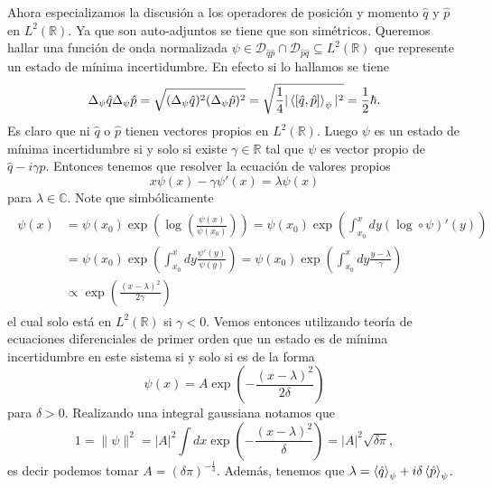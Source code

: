 \documentclass{article}
\begin{document}
\begin{enumerate}
Ahora especializamos la discusión a los operadores de posición y momento $\hat{q}$ y $\hat{p}$ en $L^2(\mathbb{R})$. Ya que son auto-adjuntos se tiene que son simétricos. Queremos hallar una función de onda normalizada $\psi\in\mathcal{D}_{\hat{q}\hat{p}}\cap\mathcal{D}_{\hat{p}\hat{q}}\subseteq L^2(\mathbb{R})$ que represente un estado de mínima incertidumbre. En efecto si lo hallamos se tiene
\begin{equation}
\Delta_\psi \hat{q}\Delta_\psi \hat{p}=\sqrt{(\Delta_\psi \hat{q})^2(\Delta_\psi \hat{p})^2}=\sqrt{\frac{1}{4}|\ev{[\hat{q},\hat{p}]}_\psi|^2}=\frac{1}{2}\hbar.
\end{equation}
Es claro que ni $\hat{q}$ o $\hat{p}$ tienen vectores propios en $L^2(\mathbb{R})$. Luego $\psi$ es un estado de mínima incertidumbre si y solo si existe $\gamma\in\mathbb{R}$ tal que $\psi$ es vector propio de $\hat{q}-i\gamma\hat{p}$. Entonces tenemos que resolver la ecuación de valores propios
\begin{equation}
x\psi(x)-\gamma\psi'(x)=\lambda\psi(x)
\end{equation}
para $\lambda\in\mathbb{C}$. Note que simbólicamente
\begin{align}
\begin{split}
\psi(x)&=\psi(x_0)\exp(\log(\frac{\psi(x)}{\psi(x_0)}))=\psi(x_0)\exp(\int_{x_0}^xdy(\log\circ\psi)'(y))\\
&=\psi(x_0)\exp(\int_{x_0}^xdy\frac{\psi'(y)}{\psi(y)})=\psi(x_0)\exp(\int_{x_0}^xdy\frac{y-\lambda}{\gamma})\\
&\propto\exp(\frac{(x-\lambda)^2}{2\gamma})
\end{split}
\end{align}
el cual solo está en $L^2(\mathbb{R})$ si $\gamma<0$. Vemos entonces utilizando teoría de ecuaciones diferenciales de primer orden que un estado es de mínima incertidumbre en este sistema si y solo si es de la forma
\begin{equation}
\psi(x)=A\exp(-\frac{(x-\lambda)^2}{2\delta})
\end{equation}
para $\delta>0$. Realizando una integral gaussiana notamos que 
\begin{equation}
1=\|\psi\|^2=|A|^2\int dx \exp(-\frac{(x-\lambda)^2}{\delta})=|A|^2\sqrt{\delta\pi},
\end{equation}
es decir podemos tomar $A=(\delta\pi)^{-\frac{1}{4}}$. Además,  tenemos que $\lambda = \ev{\hat{q}}_\psi+i\delta\ev{\hat{p}}_\psi$.
\end{enumerate}



\end{document}

